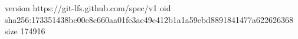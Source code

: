 version https://git-lfs.github.com/spec/v1
oid sha256:173351438bc00e8c660aa01fe3ae49e412b1a1a59ebd8891841477a622626368
size 174916
